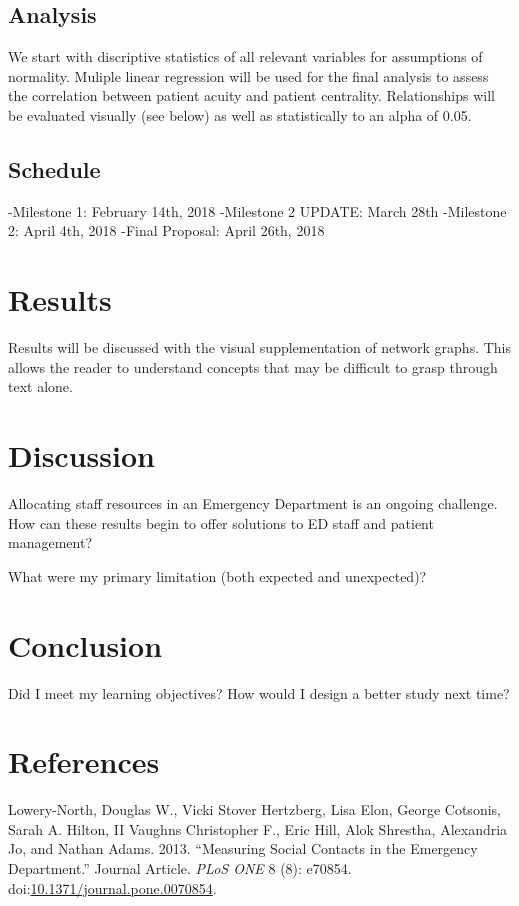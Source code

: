 \documentclass[]{elsarticle} %
\begin{document}
\subsection{Analysis}\label{analysis}

We start with discriptive statistics of all relevant variables for
assumptions of normality. Muliple linear regression will be used for the
final analysis to assess the correlation between patient acuity and
patient centrality. Relationships will be evaluated visually (see below)
as well as statistically to an alpha of 0.05.

\subsection{Schedule}\label{schedule}

-Milestone 1: February 14th, 2018 -Milestone 2 UPDATE: March 28th
-Milestone 2: April 4th, 2018 -Final Proposal: April 26th, 2018

\section{Results}\label{results}

Results will be discussed with the visual supplementation of network
graphs. This allows the reader to understand concepts that may be
difficult to grasp through text alone.

\section{Discussion}\label{discussion}

Allocating staff resources in an Emergency Department is an ongoing
challenge. How can these results begin to offer solutions to ED staff
and patient management?

What were my primary limitation (both expected and unexpected)?

\section{Conclusion}\label{conclusion}

Did I meet my learning objectives? How would I design a better study
next time?

\section*{References}\label{references.unnumbered}

\hypertarget{refs}{}
\hypertarget{ref-RN1X}{}
Lowery-North, Douglas W., Vicki Stover Hertzberg, Lisa Elon, George
Cotsonis, Sarah A. Hilton, II Vaughns Christopher F., Eric Hill, Alok
Shrestha, Alexandria Jo, and Nathan Adams. 2013. ``Measuring Social
Contacts in the Emergency Department.'' Journal Article. \emph{PLoS ONE}
8 (8): e70854.
doi:\href{https://doi.org/10.1371/journal.pone.0070854}{10.1371/journal.pone.0070854}.
\end{document}

